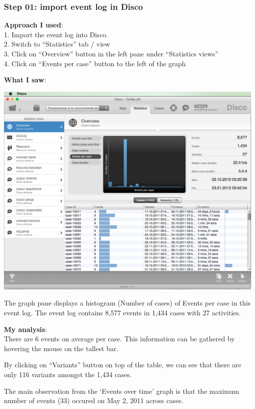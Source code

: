 \documentclass[]{article}
\begin{document}
\subsubsection{Step 01: import event log in
Disco}\label{step-01-import-event-log-in-disco}

\textbf{Approach I used}:\\1. Import the event log into Disco.\\2.
Switch to ``Statistics'' tab / view\\3. Click on ``Overview'' button in
the left pane under ``Statistics views''\\4. Click on ``Events per
case'' button to the left of the graph

\textbf{What I saw}:

\includegraphics{CoSeLoG_Step_01_Q_01.png}

The graph pane displays a histogram (Number of cases) of Events per case
in this event log. The event log contains 8,577 events in 1,434 cases
with 27 activities.

\textbf{My analysis}:\\There are 6 events on average per case. This
information can be gathered by hovering the mouse on the tallest bar.

By clicking on ``Variants'' button on top of the table, we can see that
there are only 116 variants amongst the 1,434 cases.

The main observation from the `Events over time' graph is that the
maximum number of events (33) occured on May 2, 2011 across cases.
\end{document}
